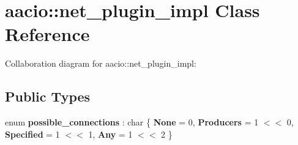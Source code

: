 \hypertarget{classaacio_1_1net__plugin__impl}{}\section{aacio\+:\+:net\+\_\+plugin\+\_\+impl Class Reference}
\label{classaacio_1_1net__plugin__impl}


Collaboration diagram for aacio\+:\+:net\+\_\+plugin\+\_\+impl\+:
\subsection*{Public Types}
\begin{DoxyCompactItemize}
\item 
\mbox{\label{classaacio_1_1net__plugin__impl_a0eaa9f4977468be800393b2c820a1c3c}} 
enum {\bfseries possible\+\_\+connections} \+: char \{ {\bfseries None} = 0, 
{\bfseries Producers} = 1 $<$$<$ 0, 
{\bfseries Specified} = 1 $<$$<$ 1, 
{\bfseries Any} = 1 $<$$<$ 2
 \}
\end{DoxyCompactItemize}
